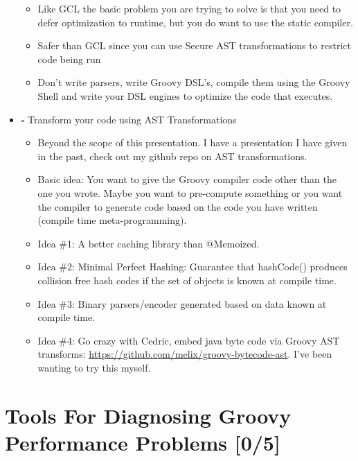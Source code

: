 \documentclass[11pt]{article}
\begin{document}
\begin{itemize}
\begin{itemize}
\item Like GCL the basic problem you are trying to solve is that you need to defer optimization to runtime, but you do want to use the static compiler.

\item Safer than GCL since you can use Secure AST transformations to restrict code being run

\item Don't write parsers, write Groovy DSL's, compile them using the Groovy Shell and write your DSL engines to optimize the code that executes.
\end{itemize}

\item $\square$ Transform your code using AST Transformations

\begin{itemize}
\item Beyond the scope of this presentation. I have a presentation I have given in the past, check out my github repo on AST transformations.

\item Basic idea: You want to give the Groovy compiler code other than the one you wrote. Maybe you want to pre-compute something or you want the compiler to generate code based on the code you have written (compile time meta-programming).

\item Idea \#1: A better caching library than @Memoized.

\item Idea \#2: Minimal Perfect Hashing: Guarantee that hashCode() produces collision free hash codes if the set of objects is known at compile time.

\item Idea \#3: Binary parsers/encoder generated based on data known at compile time.

\item Idea \#4: Go crazy with Cedric, embed java byte code via Groovy AST transforms: \url{https://github.com/melix/groovy-bytecode-ast}. I've been wanting to try this myself.
\end{itemize}
\end{itemize}

\section{Tools For Diagnosing Groovy Performance Problems [0/5]}
\label{sec:orgheadline8}
\end{document}
